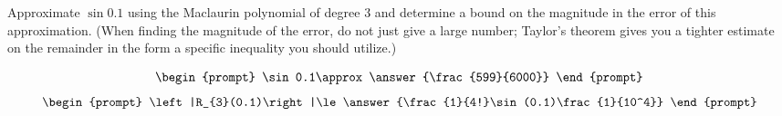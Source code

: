 \documentclass{ximera}
\author{Gregory Hartman \and Matthew Carr}
\begin{document}
\begin{exercise}






Approximate $\sin 0.1$ using the Maclaurin polynomial of degree $3$ and determine a bound on the magnitude in the error of this approximation. (When finding the magnitude of the error, do not just give a large number; Taylor's theorem gives you a tighter estimate on the remainder in the form a specific inequality you should utilize.)

\[
\begin{prompt}
\sin 0.1\approx\answer{\frac{599}{6000}}
\end{prompt}
\]
\[
\begin{prompt}
\left|R_{3}(0.1)\right|\le\answer{\frac{1}{4!}\sin(0.1)\frac{1}{10^4}}
\end{prompt}
\]

\end{exercise}
\end{document}
